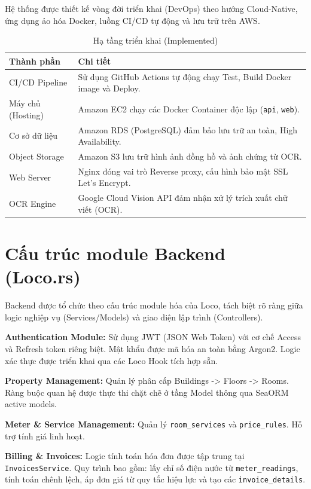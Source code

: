 Hệ thống được thiết kế vòng đời triển khai (DevOps) theo hướng Cloud-Native, ứng dụng ảo hóa Docker, luồng CI/CD tự động và lưu trữ trên AWS.

\begin{table}[htbp]
\centering
\caption{Hạ tầng triển khai (Implemented)}
\label{tab:infra}
\begin{tabularx}{\textwidth}{l>{\raggedright\arraybackslash}X}
\toprule
\textbf{Thành phần} & \textbf{Chi tiết} \\
\midrule
CI/CD Pipeline & Sử dụng GitHub Actions tự động chạy Test, Build Docker image và Deploy. \\
Máy chủ (Hosting) & Amazon EC2 chạy các Docker Container độc lập (\texttt{api}, \texttt{web}). \\
Cơ sở dữ liệu & Amazon RDS (PostgreSQL) đảm bảo lưu trữ an toàn, High Availability. \\
Object Storage & Amazon S3 lưu trữ hình ảnh đồng hồ và ảnh chứng từ OCR. \\
Web Server & Nginx đóng vai trò Reverse proxy, cấu hình bảo mật SSL Let's Encrypt. \\
OCR Engine & Google Cloud Vision API đảm nhận xử lý trích xuất chữ viết (OCR). \\
\bottomrule
\end{tabularx}
\end{table}

\section{Cấu trúc module Backend (Loco.rs)}

Backend được tổ chức theo cấu trúc module hóa của Loco, tách biệt rõ ràng giữa logic nghiệp vụ (Services/Models) và giao diện lập trình (Controllers).

\textbf{Authentication Module:} Sử dụng JWT (JSON Web Token) với cơ chế Access và Refresh token riêng biệt. Mật khẩu được mã hóa an toàn bằng Argon2. Logic xác thực được triển khai qua các Loco Hook tích hợp sẵn.

\textbf{Property Management:} Quản lý phân cấp Buildings -> Floors -> Rooms. Ràng buộc quan hệ được thực thi chặt chẽ ở tầng Model thông qua SeaORM active models.

\textbf{Meter \& Service Management:} Quản lý \texttt{room\_services} và \texttt{price\_rules}. Hỗ trợ tính giá linh hoạt.

\textbf{Billing \& Invoices:} Logic tính toán hóa đơn được tập trung tại \texttt{InvoicesService}. Quy trình bao gồm: lấy chỉ số điện nước từ \texttt{meter\_readings}, tính toán chênh lệch, áp đơn giá từ quy tắc hiệu lực và tạo các \texttt{invoice\_details}.

